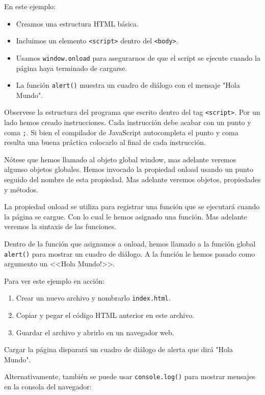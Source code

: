 \documentclass{book}
\begin{document}
En este ejemplo:

\begin{itemize}
    \item Creamos una estructura HTML básica.
    \item Incluimos un elemento \texttt{<script>} dentro del \texttt{<body>}.
    \item Usamos \texttt{window.onload} para asegurarnos de que el script se ejecute cuando la página haya terminado de cargarse.
    \item La función \texttt{alert()} muestra un cuadro de diálogo con el mensaje "Hola Mundo".
\end{itemize}

Observese la estructura del programa que escrito dentro del tag \texttt{<script>}. Por un lado hemos creado instrucciones.
Cada instrucción debe acabar con un punto y coma \texttt{;}. Si bien el compilador de JavaScript autocompleta el punto y coma
resulta una buena práctica colocarlo al final de cada instrucción.

Nótese que hemos llamado al objeto global window, mas adelante veremos algunso objetos globales. Hemos invocado la propiedad
onload usando un punto seguido del nombre de esta propiedad. Mas adelante veremos objetos, propiedades y métodos.

La propiedad onload se utiliza para registrar una función que se ejecutará cuando la página se cargue. Con lo cual le hemos asignado
una función. Mas adelante veremos la sintaxis de las funciones.

Dentro de la función que asignamos a onload, hemos llamado a la función global \texttt{alert()} para mostrar un cuadro de diálogo.
A la función le hemos pasado como argumento un <<Hola Mundo!>>.

Para ver este ejemplo en acción:

\begin{enumerate}
    \item Crear un nuevo archivo y nombrarlo \texttt{index.html}.
    \item Copiar y pegar el código HTML anterior en este archivo.
    \item Guardar el archivo y abrirlo en un navegador web.
\end{enumerate}

Cargar la página disparará un cuadro de diálogo de alerta que dirá "Hola Mundo".

Alternativamente, también se puede usar \texttt{console.log()} para mostrar mensajes en la consola del navegador:
\end{document}
